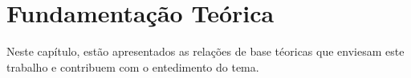 \chapter{Fundamentação Teórica}\label{ch:fundamentacao-teorica}

Neste capítulo, estão apresentados as relações de base téoricas que
enviesam este trabalho e contribuem com o entedimento do tema.


